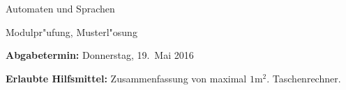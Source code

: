 %
%
%


\pagestyle{fancy}
\phantom{a}
\vspace{0.8cm}

\begin{center}
{\LARGE Automaten und Sprachen}

\vspace{1cm}
{\Large Modulpr"ufung, Musterl"osung}
\vspace{3cm}
\end{center}

{\parindent 0pt
{\bf Abgabetermin:}
Donnerstag, 19.~Mai 2016

{\bf Erlaubte Hilfsmittel:} Zusammenfassung von maximal $1\text{m}^2$.
Taschenrechner.

}





